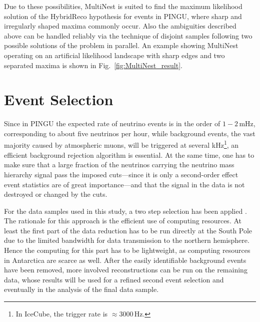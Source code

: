 Due to these possibilities, MultiNest is suited to find the maximum likelihood
solution of the HybridReco hypothesis for events in PINGU, where sharp and
irregularly shaped maxima commonly occur. Also the ambiguities described above
can be handled reliably via the technique of disjoint samples following two
possible solutions of the problem in parallel. An example showing MultiNest
operating on an artificial likelihood landscape with sharp edges and two
separated maxima is shown in Fig.~\ref{fig:MultiNest_result}.

\section{Event Selection}
\label{sec:EvtSel}

Since in PINGU the expected rate of neutrino events is in the order of $1 -
2$\,mHz, corresponding to about five neutrinos per hour, while background
events, the vast majority caused by atmospheric muons, will be triggered at
several kHz\footnote{In IceCube, the trigger rate is $\approx 3000$\,Hz.}, an
efficient background rejection algorithm is essential. At the same time, one
has to make sure that a large fraction of the neutrinos carrying the neutrino
mass hierarchy signal pass the imposed cuts---since it is only a second-order
effect event statistics are of great importance---and that the signal in the
data is not destroyed or changed by the cuts.

For the data samples used in this study, a two step selection has been applied
\cite{Processing}. The rationale for this approach is the efficient use of
computing resources. At least the first part of the data reduction has to be run
directly at the South Pole due to the limited bandwidth for data transmission to
the northern hemisphere. Hence the computing for this part has to be
lightweight, as computing resources in Antarctica are scarce as well. After the
easily identifiable background events have been removed, more involved
reconstructions can be run on the remaining data, whose results will be used for
a refined second event selection and eventually in the analysis of the final
data sample.


